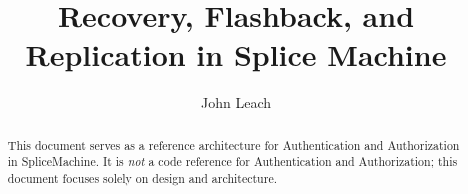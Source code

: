 \documentclass[10pt]{amsart}
\begin{document}
\title{Recovery, Flashback, and Replication in Splice Machine }
\author{John Leach}

\begin{abstract}
This document serves as a reference architecture for Authentication and
Authorization in SpliceMachine.  It is \emph{not} a
code reference for Authentication and Authorization; this document focuses
solely on design and architecture.
\end{abstract}

\maketitle


\end{document}
